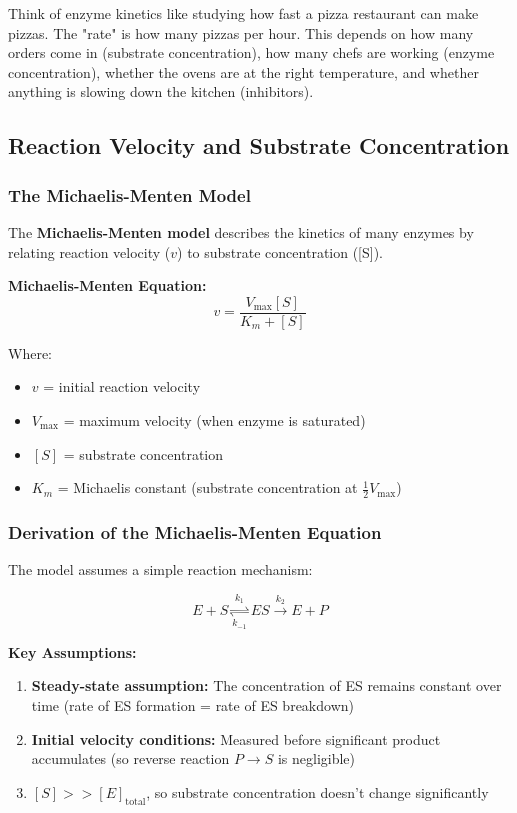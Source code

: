 \begin{analogy}
Think of enzyme kinetics like studying how fast a pizza restaurant can make pizzas. The "rate" is how many pizzas per hour. This depends on how many orders come in (substrate concentration), how many chefs are working (enzyme concentration), whether the ovens are at the right temperature, and whether anything is slowing down the kitchen (inhibitors).
\end{analogy}

\subsection{Reaction Velocity and Substrate Concentration}

\subsubsection{The Michaelis-Menten Model}

\begin{definition}
The \textbf{Michaelis-Menten model} describes the kinetics of many enzymes by relating reaction velocity ($v$) to substrate concentration ([S]).
\end{definition}

\begin{theorem}
\textbf{Michaelis-Menten Equation:}
\[
v = \frac{V_{\max}[S]}{K_m + [S]}
\]

Where:
\begin{itemize}
    \item $v$ = initial reaction velocity
    \item $V_{\max}$ = maximum velocity (when enzyme is saturated)
    \item $[S]$ = substrate concentration
    \item $K_m$ = Michaelis constant (substrate concentration at $\frac{1}{2}V_{\max}$)
\end{itemize}
\end{theorem}

\subsubsection{Derivation of the Michaelis-Menten Equation}

The model assumes a simple reaction mechanism:

\[
E + S \underset{k_{-1}}{\stackrel{k_1}{\rightleftharpoons}} ES \xrightarrow{k_2} E + P
\]

\textbf{Key Assumptions:}
\begin{enumerate}
    \item \textbf{Steady-state assumption:} The concentration of ES remains constant over time (rate of ES formation = rate of ES breakdown)
    \item \textbf{Initial velocity conditions:} Measured before significant product accumulates (so reverse reaction $P \rightarrow S$ is negligible)
    \item $[S] >> [E]_{\text{total}}$, so substrate concentration doesn't change significantly
\end{enumerate}


